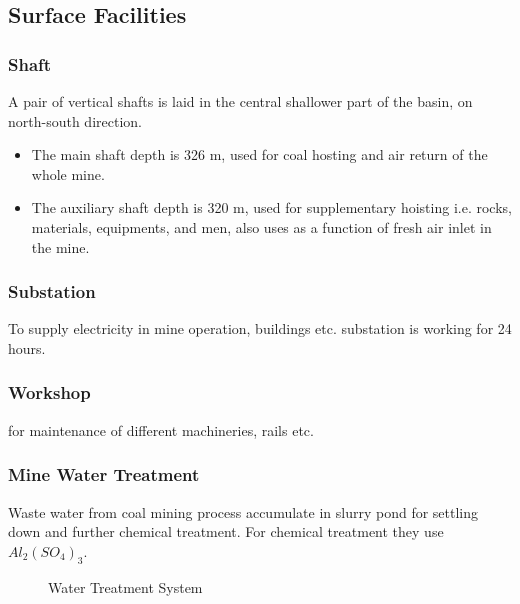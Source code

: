 \documentclass[12pt,a4paper]{article}
\begin{document}
\subsection{Surface Facilities}
\subsubsection{Shaft}
A pair of vertical shafts is laid in the central shallower part of the basin, on north-south direction.
\begin{itemize}
\item The main shaft depth is 326 m, used for coal hosting and air return of the whole mine.
\item The auxiliary shaft depth is 320 m, used for supplementary hoisting i.e. rocks, materials, equipments, and men, also uses as a function of fresh air inlet in the mine.
\end{itemize} 
\subsubsection{Substation}
To supply electricity in mine operation, buildings etc. substation is working for 24 hours.
\subsubsection{Workshop}
for maintenance of different machineries, rails etc.
\subsubsection{Mine Water Treatment}
Waste water from coal mining process accumulate in slurry pond for settling down and further chemical treatment. For chemical treatment they use $Al_2(SO_4)_3$.
\begin{figure}[ht]
\centering
{}
\caption{Water Treatment System}
\label{watertreatment}
\end{figure}
\clearpage
\end{document}
